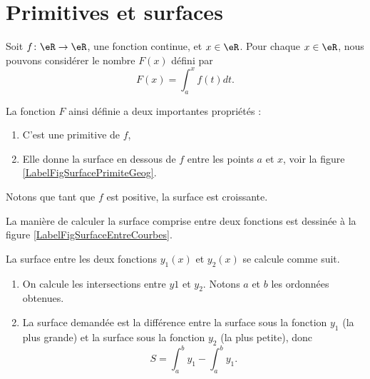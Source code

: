					\section{Primitives et surfaces}

Soit $f\colon \eR\to \eR$, une fonction continue, et $x\in\eR$. Pour chaque $x\in\eR$, nous pouvons considérer le nombre $F(x)$ défini par
\begin{equation}
	F(x)=\int_a^x f(t)dt.
\end{equation}


\newcommand{\CaptionFigSurfacePrimiteGeog}{Surface sous une courbe.}


La fonction $F$ ainsi définie a deux importantes propriétés :
\begin{enumerate}

\item
C'est une primitive de $f$,
\item
Elle donne la surface en dessous de $f$ entre les points $a$ et $x$, voir la figure \ref{LabelFigSurfacePrimiteGeog}.

\end{enumerate}

Notons que tant que $f$ est positive, la surface est croissante.

La manière de calculer la surface comprise entre deux fonctions est dessinée à la figure \ref{LabelFigSurfaceEntreCourbes}.
\newcommand{\CaptionFigSurfaceEntreCourbes}{Le calcul de la surface comprise entre deux fonctions.}


La surface entre les deux fonctions $y_1(x)$ et $y_2(x)$ se calcule comme suit.
\begin{enumerate}

\item
On calcule les intersections entre $y1$ et $y_2$. Notons $a$ et $b$ les ordonnées obtenues.
\item
La surface demandée est la différence entre la surface sous la fonction $y_1$ (la plus grande) et la surface sous la fonction $y_2$ (la plus petite), donc
\begin{equation}
	S=\int_{a}^by_1-\int_a^by_1.
\end{equation}

\end{enumerate}


